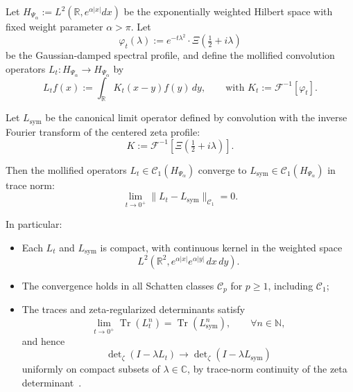 \begin{lemma}
\label{lem:kernel_trace_norm_convergence}

Let \( H_{\Psi_\alpha} := L^2(\mathbb{R}, e^{\alpha |x|} dx) \) be the exponentially weighted Hilbert space with fixed weight parameter \( \alpha > \pi \). Let
\[
\varphi_t(\lambda) := e^{-t\lambda^2} \cdot \Xi\left( \tfrac{1}{2} + i\lambda \right)
\]
be the Gaussian-damped spectral profile, and define the mollified convolution operators \( L_t \colon H_{\Psi_\alpha} \to H_{\Psi_\alpha} \) by
\[
L_t f(x) := \int_{\mathbb{R}} K_t(x - y) f(y) \, dy, \qquad \text{with } K_t := \mathcal{F}^{-1}[\varphi_t].
\]

Let \( L_{\mathrm{sym}} \) be the canonical limit operator defined by convolution with the inverse Fourier transform of the centered zeta profile:
\[
K := \mathcal{F}^{-1}\left[ \Xi\left(\tfrac{1}{2} + i\lambda \right) \right].
\]

\medskip
\noindent
Then the mollified operators \( L_t \in \mathcal{C}_1(H_{\Psi_\alpha}) \) converge to \( L_{\mathrm{sym}} \in \mathcal{C}_1(H_{\Psi_\alpha}) \) in trace norm:
\[
\lim_{t \to 0^+} \| L_t - L_{\mathrm{sym}} \|_{\mathcal{C}_1} = 0.
\]

\medskip
\noindent
In particular:
\begin{itemize}
  \item Each \( L_t \) and \( L_{\mathrm{sym}} \) is compact, with continuous kernel in the weighted space
  \[
  L^2\left( \mathbb{R}^2, e^{\alpha |x|} e^{\alpha |y|} \, dx \, dy \right).
  \]
  \item The convergence holds in all Schatten classes \( \mathcal{C}_p \) for \( p \ge 1 \), including \( \mathcal{C}_1 \);
  \item The traces and zeta-regularized determinants satisfy
  \[
  \lim_{t \to 0^+} \operatorname{Tr}(L_t^n) = \operatorname{Tr}(L_{\mathrm{sym}}^n), \qquad \forall n \in \mathbb{N},
  \]
  and hence
  \[
  \det\nolimits_\zeta(I - \lambda L_t) \to \det\nolimits_\zeta(I - \lambda L_{\mathrm{sym}})
  \]
  uniformly on compact subsets of \( \lambda \in \mathbb{C} \), by trace-norm continuity of the zeta determinant~\cite[Ch.~4]{Simon2005TraceIdeals}.
\end{itemize}
\end{lemma}
